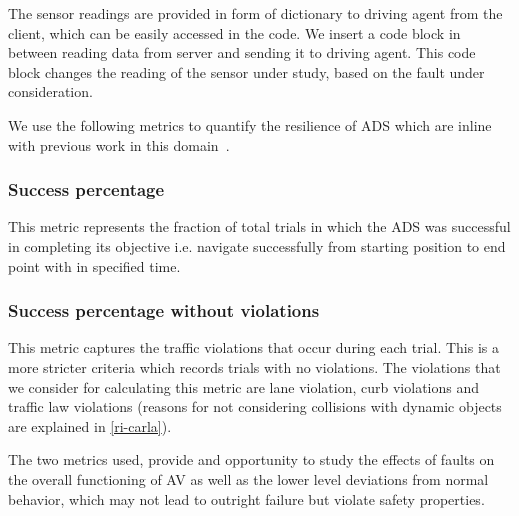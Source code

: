  The sensor readings are provided in form of dictionary to driving agent from the client, which can be easily accessed in the code. We insert a code block in between reading data from server and sending it to driving agent. This code block changes the reading of the sensor under study, based on the fault under consideration.
 
 We use the following metrics to quantify the resilience of ADS which are inline with previous work in this domain~\cite{avfi}.
 \setcounter{subsubsection}{0}
 
 \medskip
 \subsubsection{Success percentage} This metric represents the fraction of total trials in which the ADS was successful in completing its objective i.e. navigate successfully from starting position to end point with in specified time.
 
 \smallskip
 
 \subsubsection{Success percentage without violations} This metric captures the traffic violations that occur during each trial. This is a more stricter criteria which records trials with no violations. The violations that we consider for calculating this metric are lane violation, curb violations and traffic law violations (reasons for not considering collisions with dynamic objects are explained in \ref{ri-carla}). 
 
 The two metrics used, provide and opportunity to study the effects of faults on the overall functioning of AV as well as the lower level deviations from normal behavior, which may not lead to outright failure but violate safety properties.
 